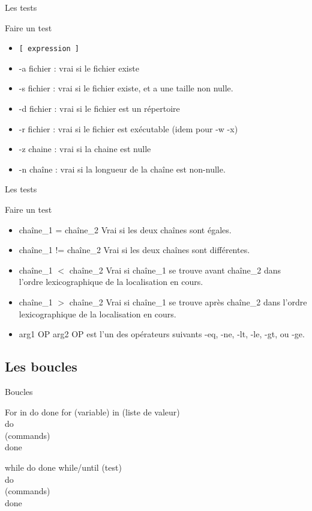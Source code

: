 \begin{frame}{Les tests}
\begin{block}{Faire un test}
\begin{itemize}
\item \verb![ expression ]!
\item -a fichier : vrai si le fichier existe
\item -s fichier : vrai si le fichier existe, et a une taille non nulle.
\item -d fichier : vrai si le fichier est un répertoire
\item -r fichier : vrai si le fichier est exécutable (idem pour -w -x)
\item -z chaine : vrai si la chaine est nulle
\item -n chaîne : vrai si la longueur de la chaîne est non-nulle. 
\end{itemize}
\end{block}
\end{frame}

\begin{frame}{Les tests}
\begin{block}{Faire un test}
\begin{itemize}
\item chaîne\_1 = chaîne\_2
    Vrai si les deux chaînes sont égales.
\item chaîne\_1 != chaîne\_2
    Vrai si les deux chaînes sont différentes.
\item chaîne\_1 $<$ chaîne\_2
    Vrai si chaîne\_1 se trouve avant chaîne\_2 dans l'ordre lexicographique de la localisation en cours. 
\item chaîne\_1 $>$ chaîne\_2
    Vrai si chaîne\_1 se trouve après chaîne\_2 dans l'ordre lexicographique de la localisation en cours. 
\item arg1 OP arg2
    OP est l'un des opérateurs suivants -eq, -ne, -lt, -le, -gt, ou -ge.
\end{itemize}
\end{block}
\end{frame}

\subsection{Les boucles}
\begin{frame}{Boucles}
\begin{block}{For in do done}
for (variable) in (liste de valeur)\\
do\\
(commands)\\
done
\end{block}


\begin{block}{while do done}
while/until (test)\\
do\\
(commands)\\
done
\end{block}
\end{frame}

